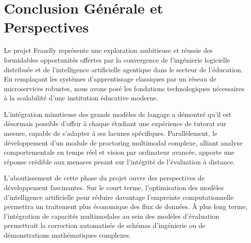 \chapter*{Conclusion Générale et Perspectives}

Le projet Fraudly représente une exploration ambitieuse et réussie des formidables opportunités offertes par la convergence de l'ingénierie logicielle distribuée et de l'intelligence artificielle agentique dans le secteur de l'éducation. En remplaçant les systèmes d'apprentissage classiques par un réseau de microservices robustes, nous avons posé les fondations technologiques nécessaires à la scalabilité d'une institution éducative moderne.

L'intégration minutieuse des grands modèles de langage a démontré qu'il est désormais possible d'offrir à chaque étudiant une expérience de tutorat sur mesure, capable de s'adapter à ses lacunes spécifiques. Parallèlement, le développement d'un module de proctoring multimodal complexe, alliant analyse comportementale en temps réel et vision par ordinateur avancée, apporte une réponse crédible aux menaces pesant sur l'intégrité de l'évaluation à distance.

L'aboutissement de cette phase du projet ouvre des perspectives de développement fascinantes. Sur le court terme, l'optimisation des modèles d'intelligence artificielle pour réduire davantage l'empreinte computationnelle permettra un traitement plus économique des flux de données. À plus long terme, l'intégration de capacités multimodales au sein des modèles d'évaluation permettrait la correction automatisée de schémas d'ingénierie ou de démonstrations mathématiques complexes.
